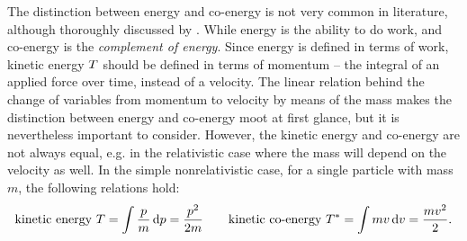 The distinction between energy and co-energy is not very common in literature, although thoroughly discussed by \citet{Jeltsema2009}. While energy is the ability to do work, and co-energy is the \emph{complement of energy}. Since energy is defined in terms of work, kinetic energy $T$ should be defined in terms of momentum -- the integral of an applied force over time, instead of a velocity. The linear relation behind the change of variables from momentum to velocity by means of the mass makes the distinction between energy and co-energy moot at first glance, but it is nevertheless important to consider. However, the kinetic energy and co-energy are not always equal, e.g. in the relativistic case where the mass will depend on the velocity as well. In the simple nonrelativistic case, for a single particle with mass $m$, the following relations hold:
$$ \text{kinetic energy } T = \int \frac{p}{m}\dd{p} = \frac{p^2}{2m}\qquad
   \text{kinetic co-energy } T^* = \int m v \dd{v} = \frac{mv^2}{2}.$$

